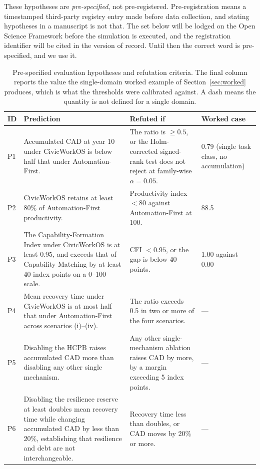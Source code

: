 	These hypotheses are \textit{pre-specified}, not pre-registered. Pre-registration means a timestamped third-party registry entry made before data collection, and stating hypotheses in a manuscript is not that. The set below will be lodged on the Open Science Framework before the simulation is executed, and the registration identifier will be cited in the version of record. Until then the correct word is pre-specified, and we use it.
	
	\begin{table}[!htbp]
		\caption{Pre-specified evaluation hypotheses and refutation criteria. The final column reports the value the single-domain worked example of Section~\ref{sec:worked} produces, which is what the thresholds were calibrated against. A dash means the quantity is not defined for a single domain.}
		\label{tab:predictions}
		\footnotesize
		\begin{tabularx}{\textwidth}{@{}p{0.5cm}XXp{1.9cm}@{}}
			\toprule
			\textbf{ID} & \textbf{Prediction} & \textbf{Refuted if} & \textbf{Worked case}\\
			\midrule
			P1 & Accumulated CAD at year 10 under CivicWorkOS is below half that under Automation-First. & The ratio is $\geq 0.5$, or the Holm-corrected signed-rank test does not reject at family-wise $\alpha=0.05$. & 0.79 (single task class, no accumulation)\\
			P2 & CivicWorkOS retains at least 80\% of Automation-First productivity. & Productivity index $< 80$ against Automation-First at 100. & 88.5\\
			P3 & The Capability-Formation Index under CivicWorkOS is at least 0.95, and exceeds that of Capability Matching by at least 40 index points on a 0--100 scale. & CFI $< 0.95$, or the gap is below 40 points. & 1.00 against 0.00\\
			P4 & Mean recovery time under CivicWorkOS is at most half that under Automation-First across scenarios (i)--(iv). & The ratio exceeds 0.5 in two or more of the four scenarios. & ---\\
			P5 & Disabling the HCPB raises accumulated CAD more than disabling any other single mechanism. & Any other single-mechanism ablation raises CAD by more, by a margin exceeding 5 index points. & ---\\
			P6 & Disabling the resilience reserve at least doubles mean recovery time while changing accumulated CAD by less than 20\%, establishing that resilience and debt are not interchangeable. & Recovery time less than doubles, or CAD moves by 20\% or more. & ---\\

\end{tabularx}
\end{table}
